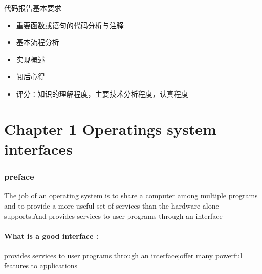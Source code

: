 \documentclass{thuemp}
\begin{document}
\wuhao 
代码报告基本要求
\begin{itemize}
  \item 重要函数或语句的代码分析与注释
  \item 基本流程分析
  \item 实现概述
  \item 阅后心得
  \item 评分：知识的理解程度，主要技术分析程度，认真程度
\end{itemize}
\part*{Chapter 1 Operatings system interfaces}
\section*{preface}
The job of an operating system is to share a computer among multiple programs and to provide a more useful set of services than the hardware alone supports.And provides services to user programs through an interface\\
\subsection*{What is a good interface :} provides services to user programs through an interface;offer many powerful features to applications\\
\end{document}
